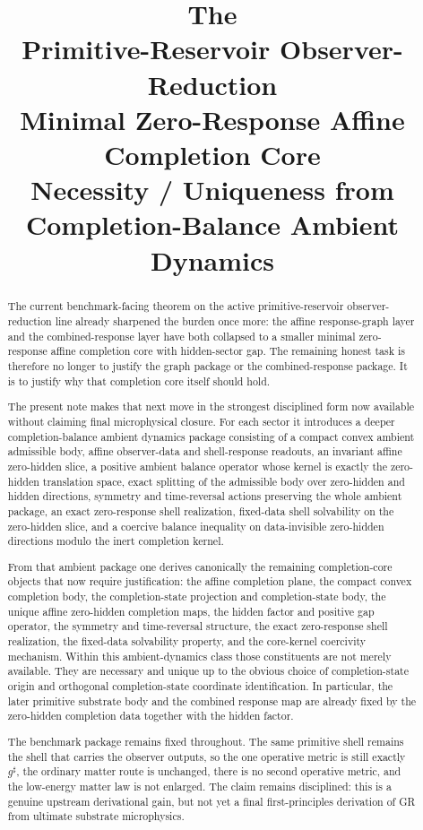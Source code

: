 \documentclass[11pt]{article}
\title{\textbf{The \TheoryName{}}\\[0.4em]
\large Primitive-Reservoir Observer-Reduction\\
\large Minimal Zero-Response Affine Completion Core\\
\large Necessity / Uniqueness from Completion-Balance Ambient Dynamics}
\author{}
\date{}
\newcommand{\CompletedMetric}{g^{\sharp}}
\begin{document}
\maketitle

\begin{abstract}
The current benchmark-facing theorem on the active primitive-reservoir observer-reduction line already sharpened the burden once more: the affine response-graph layer and the combined-response layer have both collapsed to a smaller minimal zero-response affine completion core with hidden-sector gap. The remaining honest task is therefore no longer to justify the graph package or the combined-response package. It is to justify why that completion core itself should hold.

The present note makes that next move in the strongest disciplined form now available without claiming final microphysical closure. For each sector it introduces a deeper completion-balance ambient dynamics package consisting of a compact convex ambient admissible body, affine observer-data and shell-response readouts, an invariant affine zero-hidden slice, a positive ambient balance operator whose kernel is exactly the zero-hidden translation space, exact splitting of the admissible body over zero-hidden and hidden directions, symmetry and time-reversal actions preserving the whole ambient package, an exact zero-response shell realization, fixed-data shell solvability on the zero-hidden slice, and a coercive balance inequality on data-invisible zero-hidden directions modulo the inert completion kernel.

From that ambient package one derives canonically the remaining completion-core objects that now require justification: the affine completion plane, the compact convex completion body, the completion-state projection and completion-state body, the unique affine zero-hidden completion maps, the hidden factor and positive gap operator, the symmetry and time-reversal structure, the exact zero-response shell realization, the fixed-data solvability property, and the core-kernel coercivity mechanism. Within this ambient-dynamics class those constituents are not merely available. They are necessary and unique up to the obvious choice of completion-state origin and orthogonal completion-state coordinate identification. In particular, the later primitive substrate body and the combined response map are already fixed by the zero-hidden completion data together with the hidden factor.

The benchmark package remains fixed throughout. The same primitive shell remains the shell that carries the observer outputs, so the one operative metric is still exactly \(\CompletedMetric\), the ordinary matter route is unchanged, there is no second operative metric, and the low-energy matter law is not enlarged. The claim remains disciplined: this is a genuine upstream derivational gain, but not yet a final first-principles derivation of GR from ultimate substrate microphysics.
\end{abstract}
\end{document}
